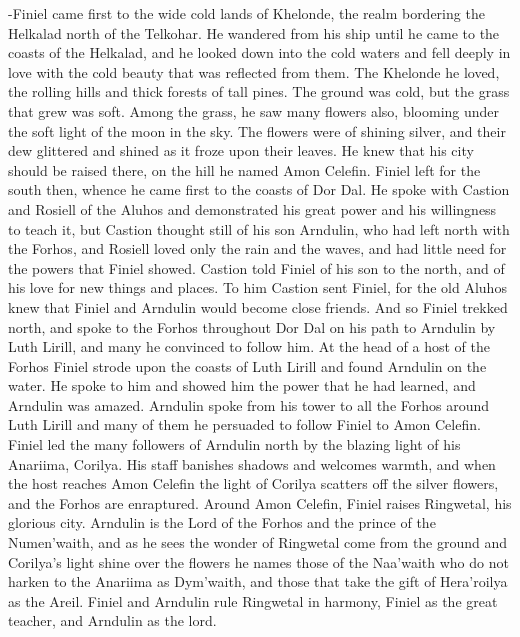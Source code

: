 \documentclass[smalldemyvopaper,11pt,twoside,onecolumn,openright,extrafontsizes]{memoir}
\begin{document}
{{-Finiel came first to the wide cold lands of Khelonde, the realm bordering the Helkalad north of the Telkohar. He wandered from his ship until he came to the coasts of the Helkalad, and he looked down into the cold waters and fell deeply in love with the cold beauty that was reflected from them. The Khelonde he loved, the rolling hills and thick forests of tall pines. The ground was cold, but the grass that grew was soft. Among the grass, he saw many flowers also, blooming under the soft light of the moon in the sky. The flowers were of shining silver, and their dew glittered and shined as it froze upon their leaves. He knew that his city should be raised there, on the hill he named Amon Celefin. Finiel left for the south then, whence he came first to the coasts of Dor Dal. He spoke with Castion and Rosiell of the Aluhos and demonstrated his great power and his willingness to teach it, but Castion thought still of his son Arndulin, who had left north with the Forhos, and Rosiell loved only the rain and the waves, and had little need for the powers that Finiel showed. Castion told Finiel of his son to the north, and of his love for new things and places. To him Castion sent Finiel, for the old Aluhos knew that Finiel and Arndulin would become close friends. And so Finiel trekked north, and spoke to the Forhos throughout Dor Dal on his path to Arndulin by Luth Lirill, and many he convinced to follow him. At the head of a host of the Forhos Finiel strode upon the coasts of Luth Lirill and found Arndulin on the water. He spoke to him and showed him the power that he had learned, and Arndulin was amazed. Arndulin spoke from his tower to all the Forhos around Luth Lirill and many of them he persuaded to follow Finiel to Amon Celefin. Finiel led the many followers of Arndulin north by the blazing light of his Anariima, Corilya. His staff banishes shadows and welcomes warmth, and when the host reaches Amon Celefin the light of Corilya scatters off the silver flowers, and the Forhos are enraptured. Around Amon Celefin, Finiel raises Ringwetal, his glorious city. Arndulin is the Lord of the Forhos and the prince of the Numen’waith, and as he sees the wonder of Ringwetal come from the ground and Corilya’s light shine over the flowers he names those of the Naa’waith who do not harken to the Anariima as Dym’waith, and those that take the gift of Hera’roilya as the Areil. Finiel and Arndulin rule Ringwetal in harmony, Finiel as the great teacher, and Arndulin as the lord.
}}
\end{document}
